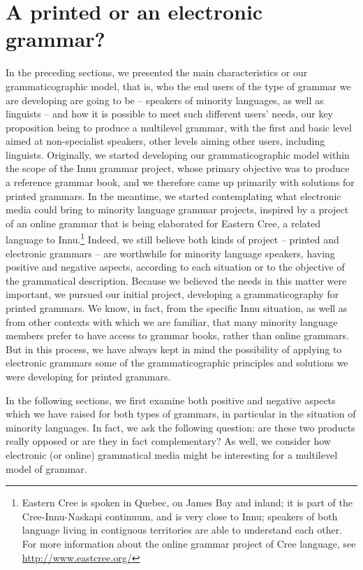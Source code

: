\section{A printed or an electronic grammar?}
In the preceding sections, we presented the main characteristics or our grammaticographic model, that is, who the end users of the type of grammar we are developing are going to be -- speakers of minority languages, as well as linguists -- and how it is possible to meet such different users' needs, our key proposition being to produce a multilevel grammar, with the first and basic level aimed at non-specialist speakers, other levels aiming other users, including linguists. Originally, we started developing our grammaticographic model within the scope of the Innu grammar project, whose primary objective was to produce a reference grammar book, and we therefore came up primarily with solutions for printed grammars. In the meantime, we started contemplating what electronic media could bring to minority language grammar projects, inspired by a project of an online grammar that is being elaborated for Eastern Cree, a related language to Innu.\footnote{Eastern 
 Cree is spoken in Quebec, on James Bay and inland; it is part of the Cree-Innu-Naskapi continuum, and is very close to Innu; speakers of both language living in contiguous territories are able to understand each other. For more information about the online grammar project of Cree language, see \url{http://www.eastcree.org/}
}  
Indeed, we still believe both kinds of project -- printed and electronic grammars -- are worthwhile for minority language speakers, having positive and negative aspects, according to each situation or to the objective of the grammatical description. Because we believed the needs in this matter were important, we pursued our initial project, developing a grammaticography for printed grammars. We know, in fact, from the specific Innu situation, as well as from other contexts with which we are familiar, that many minority language members prefer to have access to grammar books, rather than online grammars. But in this process, we have always kept in mind the possibility of applying to electronic grammars some of the grammaticographic principles and solutions we were developing for printed grammars.

In the following sections, we first examine both positive and negative aspects which we have raised for both types of grammars, in particular in the situation of minority languages. In fact, we ask the following question: are these two products really opposed or are they in fact complementary? As well, we consider how electronic (or online) grammatical media might be interesting for a multilevel model of grammar.

